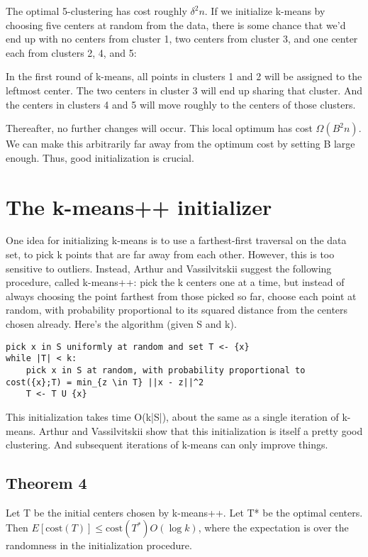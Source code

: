 \documentclass{article}
\begin{document}
The optimal 5-clustering has cost roughly $\delta^2 n$. If we initialize k-means by choosing five centers at random from the data, there is some chance that we'd end up with no centers from cluster 1, two centers from cluster 3, and one center each from clusters 2, 4, and 5:

In the first round of k-means, all points in clusters 1 and 2 will be assigned to the leftmost center. The two centers in cluster 3 will end up sharing that cluster. And the centers in clusters 4 and 5 will move roughly to the centers of those clusters.

Thereafter, no further changes will occur. This local optimum has cost $\Omega(B^2 n)$. We can make this arbitrarily far away from the optimum cost by setting B large enough. Thus, good initialization is crucial.

\section{The k-means++ initializer}

One idea for initializing k-means is to use a farthest-first traversal on the data set, to pick k points that are far away from each other. However, this is too sensitive to outliers. Instead, Arthur and Vassilvitskii suggest the following procedure, called k-means++: pick the k centers one at a time, but instead of always choosing the point farthest from those picked so far, choose each point at random, with probability proportional to its squared distance from the centers chosen already. Here's the algorithm (given S and k).
\begin{verbatim}
pick x in S uniformly at random and set T <- {x}
while |T| < k:
    pick x in S at random, with probability proportional to cost({x};T) = min_{z \in T} ||x - z||^2
    T <- T U {x}
\end{verbatim}

This initialization takes time O(k|S|), about the same as a single iteration of k-means. Arthur and Vassilvitskii show that this initialization is itself a pretty good clustering. And subsequent iterations of k-means can only improve things.

\subsection*{Theorem 4}
Let T be the initial centers chosen by k-means++. Let T* be the optimal centers. Then $E[\text{cost}(T)] \le \text{cost}(T^*) O(\log k)$, where the expectation is over the randomness in the initialization procedure.
\end{document}

